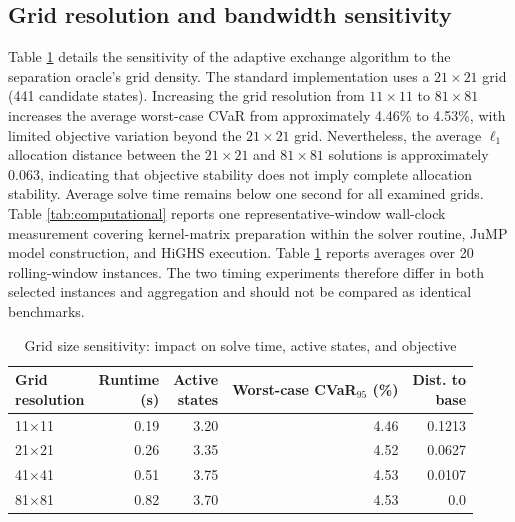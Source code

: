 \documentclass[smallextended]{svjour3}
\begin{document}
\subsection{Grid resolution and bandwidth sensitivity}
Table \ref{tab:sens_grid} details the sensitivity of the adaptive exchange algorithm to the separation oracle's grid density. The standard implementation uses a $21\times21$ grid (441 candidate states). Increasing the grid resolution from $11\times11$ to $81\times81$ increases the average worst-case CVaR from approximately 4.46\% to 4.53\%, with limited objective variation beyond the $21\times21$ grid. Nevertheless, the average $\ell_1$ allocation distance between the $21\times21$ and $81\times81$ solutions is approximately 0.063, indicating that objective stability does not imply complete allocation stability. Average solve time remains below one second for all examined grids. Table \ref{tab:computational} reports one representative-window wall-clock measurement covering kernel-matrix preparation within the solver routine, JuMP model construction, and HiGHS execution. Table \ref{tab:sens_grid} reports averages over 20 rolling-window instances. The two timing experiments therefore differ in both selected instances and aggregation and should not be compared as identical benchmarks.

\begin{table}[htbp]
\centering
\caption{Grid size sensitivity: impact on solve time, active states, and objective}
\label{tab:sens_grid}
\begin{tabular}{lrrrr}
\toprule
\makecell[l]{\textbf{Grid}\\\textbf{resolution}} & \makecell[r]{\textbf{Runtime}\\\textbf{(s)}} & \makecell[r]{\textbf{Active}\\\textbf{states}} & \makecell[r]{\textbf{Worst-case}\\\textbf{CVaR$_{95}$ (\%)}} & \makecell[r]{\textbf{Dist. to}\\\textbf{base}} \\
\midrule
11$\times$11 & 0.19 & 3.20 & 4.46 & 0.1213 \\
21$\times$21 & 0.26 & 3.35 & 4.52 & 0.0627 \\
41$\times$41 & 0.51 & 3.75 & 4.53 & 0.0107 \\
81$\times$81 & 0.82 & 3.70 & 4.53 & 0.0 \\
\bottomrule
\end{tabular}
\end{table}
\end{document}
